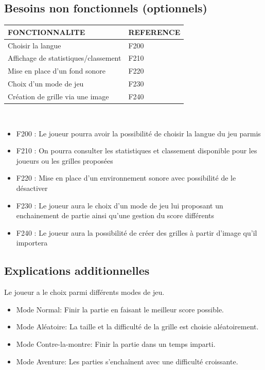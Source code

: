 \documentclass[11pt]{article}
\begin{document}
\subsection{Besoins non fonctionnels (optionnels)}

\vspace{0,5cm}
\small
\begin{tabular}{|p{10cm}|p{3cm}|}
	\hline
	\textbf{FONCTIONNALITE} & \textbf{REFERENCE}\\
	\hline
	\hline
		Choisir la langue		 									& F200 \\	\cline{1-2}	
		Affichage de statistiques/classement 						& F210 \\	\cline{1-2}	
		Mise en place d'un fond sonore 								& F220 \\	\cline{1-2}	
		Choix d'un mode de jeu										& F230 \\	\cline{1-2}	
		Création de grille via une image							& F240 \\	\cline{1-2}
	\hline
	\end{tabular}
\normalsize \\

\begin{itemize}
	\item F200 : Le joueur pourra avoir la possibilité de choisir la langue du jeu parmis 
	\item F210 : On pourra consulter les statistiques et classement disponible pour les joueurs ou les grilles proposées
	\item F220 : Mise en place d'un environnement sonore avec possibilité de le désactiver
	\item F230 : Le joueur aura le choix d'un mode de jeu lui proposant un enchainement de partie ainsi qu'une gestion du score différents
	\item F240 : Le joueur aura la possibilité de créer des grilles à partir d'image qu'il importera
\end{itemize}

\subsection{Explications additionnelles}
Le joueur a le choix parmi différents modes de jeu.
\begin{itemize}
	\item Mode Normal: Finir la partie en faisant le meilleur score possible.
	\item Mode Aléatoire: La taille et la difficulté de la grille est choisie aléatoirement. 
	\item Mode Contre-la-montre: Finir la partie dans un temps imparti.
	\item Mode Aventure: Les parties s'enchaînent avec une difficulté croissante.
\end{itemize}
\end{document}
